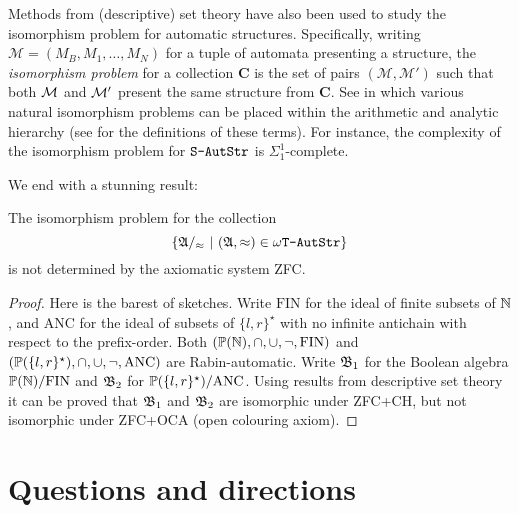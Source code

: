 Methods from (descriptive) set theory have also been used to study the isomorphism problem for automatic structures.
Specifically, writing $\mathcal{M} = (M_B,M_1,\dots,M_N)$ for a tuple of automata presenting a structure, the {\em isomorphism problem} for a collection
$\mathbf{C}$ is the set of pairs $(\mathcal{M},\mathcal{M'})$ such that both ${\mathcal M}$ and ${\mathcal M}'$ present the same structure from $\mathbf{C}$.  See \cite{Rubi04,KLL10LICS,KLL13,KLM14,Kuske14} in which various natural isomorphism problems can be placed within the arithmetic and analytic hierarchy (see \cite{Roge67} for the definitions of these terms). For instance, the complexity of the
isomorphism problem for $\mbox{\tt S-AutStr}$ is $\Sigma^1_1$-complete.

We end with a stunning result:

\begin{theorem}
The isomorphism problem for the collection 
\[
\{\mathfrak{A}/_\approx \ \vert \  (\mathfrak{A},\approx) \in \mbox{\tt $\omega$T-AutStr}\}
\]
is not determined by the axiomatic system \textrm{ZFC}.
\end{theorem}

\begin{proof}
Here is the barest of sketches. 
Write $\mathrm{FIN}$ for the ideal of finite subsets of $\mathbb{N}$, and $\mathrm{ANC}$ for the ideal of subsets of $\{l,r\}^\star$ with no infinite antichain with respect to the prefix-order.
Both $({\mathbb P}(\mathbb{N}),\cap,\cup,\neg,\mathrm{FIN})$ and $({\mathbb P}(\{l,r\}^\star),\cap,\cup,\neg,\mathrm{ANC})$ are Rabin-automatic. Write $\mathfrak{B}_1$ for the Boolean algebra ${\mathbb P}(\mathbb{N})/\mathrm{FIN}$ and $\mathfrak{B}_2$ for ${\mathbb P}(\{l,r\}^\star)/\mathrm{ANC}$.
Using results from descriptive set theory it can be proved  that $\mathfrak{B}_1$ and $\mathfrak{B}_2$  are isomorphic under ZFC+CH, but  not isomorphic under ZFC+OCA (open colouring axiom).
\end{proof}


\section{Questions and directions} \label{AS:sec:summary}

